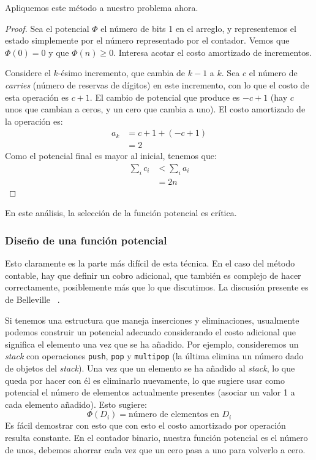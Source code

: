   Apliquemos este método a nuestro problema ahora.
  \begin{proof}
    Sea el potencial \(\Phi\) el número de bits \num{1} en el arreglo,
    y representemos el estado
    simplemente por el número representado por el contador.
    Vemos que \(\Phi(0) = 0\)
    y que \(\Phi(n) \ge 0\).
    Interesa acotar el costo amortizado de incrementos.

    Considere el \(k\)\nobreakdash-ésimo incremento,
    que cambia de \(k - 1\) a \(k\).
    Sea \(c\) el número de \emph{\foreignlanguage{english}{carries}}
    (número de reservas de dígitos)
    en este incremento,
    con lo que el costo de esta operación es \(c + 1\).
    El cambio de potencial que produce es \(- c + 1\)
    (hay \(c\) unos que cambian a ceros,
     y un cero que cambia a uno).
    El costo amortizado de la operación es:
    \begin{align*}
      a_k
        &= c + 1 + (-c + 1) \\
        &= 2
    \end{align*}
    Como el potencial final es mayor al inicial,
    tenemos que:
    \begin{align*}
      \sum_i c_i
        &< \sum_i a_i \\
        &= 2 n
    \end{align*}
  \end{proof}

  En este análisis,
  la selección de la función potencial es crítica.

\subsubsection{Diseño de una función potencial}
\label{sec:diseno-potencial}

  Esto claramente es la parte más difícil de esta técnica.
  En el caso del método contable,
  hay que definir un cobro adicional,
  que también es complejo de hacer correctamente,
  posiblemente más que lo que discutimos.
  La discusión presente es de Belleville~%
    \cite{belleville11:_amortized_analysis}.

  Si tenemos una estructura que maneja inserciones y eliminaciones,
  usualmente podemos construir un potencial adecuado
  considerando el costo adicional que significa el elemento
  una vez que se ha añadido.
  Por ejemplo,
  consideremos un \emph{\foreignlanguage{english}{stack}}
  con operaciones \verb+push+, \verb+pop+ y \verb+multipop+
  (la última elimina un número dado de objetos
   del \emph{\foreignlanguage{english}{stack}}).
  Una vez que un elemento se ha añadido
  al \emph{\foreignlanguage{english}{stack}},
  lo que queda por hacer con él es eliminarlo nuevamente,
  lo que sugiere usar como potencial
  el número de elementos actualmente presentes
  (asociar un valor \num{1} a cada elemento añadido).
  Esto sugiere:
  \begin{equation*}
    \Phi(D_i)
      = \text{número de elementos en \(D_i\)}
  \end{equation*}
  Es fácil demostrar con esto que con esto el costo amortizado por operación
  resulta constante.
  En el contador binario,
  nuestra función potencial es el número de unos,
  debemos ahorrar cada vez que un cero pasa a uno para volverlo a cero.

